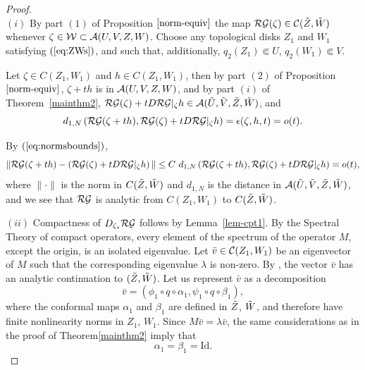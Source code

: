 \begin{proof} $\phantom{oo}$\\
\noindent $(i)$  By part $(1)$ of  Proposition $\ref{norm-equiv}$ the map $\mathcal{RG}(\zeta) \in  \mathcal{C}(\tilde Z,\tilde W)$ whenever $\zeta \in \mathcal{W} \subset \mathcal{A}(U,V,Z,W)$.  Choose any topological disks $Z_1$ and $W_1$ satisfying $(\ref{eq:ZWs})$, and such that, additionally, $q_2(Z_1) \Subset U$, $q_2(W_1) \Subset V$.

Let $\zeta \in C(Z_1,W_1)$ and $h \in C(Z_1,W_1)$, then by part $(2)$ of  Proposition $\ref{norm-equiv}$, $\zeta+t h$ is in $\mathcal{A}(U,V,Z,W)$, and by part $(i)$ of  Theorem~\ref{mainthm2},
$\mathcal{RG}(\zeta) + t D \mathcal{RG} \arrowvert_\zeta h \in \mathcal{A}(\tilde U, \tilde V, \tilde Z,\tilde W)$, and 
$$ d_{1,N} \left( \mathcal{RG}(\zeta+t h), \mathcal{RG}(\zeta) + t D \mathcal{RG} \arrowvert_\zeta h \right)=\epsilon(\zeta,h,t)=o(t).$$

By $(\ref{eq:normsbounds})$, 
$$  \| \mathcal{RG}(\zeta+t h) -\left(\mathcal{RG}(\zeta) + t D \mathcal{RG} \arrowvert_\zeta h \right) \| \le C \ d_{1,N} \left( \mathcal{RG}(\zeta+t h), \mathcal{RG}(\zeta) + t D \mathcal{RG} \arrowvert_\zeta h \right)=o(t),$$
where $\| \cdot \|$ is the norm in $C(\tilde Z, \tilde W)$ and   $d_{1,N}$ is the distance in $\mathcal{A}(\tilde U, \tilde V,\tilde Z, \tilde W)$, and we see that $\mathcal{RG}$ is analytic from $C(Z_1,W_1)$ to $C(\tilde Z, \tilde W)$.

\medskip

\noindent $(ii)$ Compactness of $D_{\zeta_*}\mathcal{RG}$ follows by  Lemma~\ref{lem-cpt1}. By the Spectral Theory of compact operators, every element of the spectrum of the operator $M$, except the origin,  is an isolated eigenvalue. Let $\bar v\in\mathcal{C}(Z_1,W_1)$ be an eigenvector of $M$ such that the corresponding eigenvalue $\lambda$ is non-zero. By , the vector $\bar v$ has an analytic continuation to $(\tilde Z,\tilde W)$. Let us represent $\bar v$ as a decomposition
$$\bar v=(\phi_1\circ q\circ\alpha_1,\psi_1\circ q\circ \beta_1),$$
 where the conformal maps $\alpha_1$ and $\beta_1$ are defined in $\tilde Z$, $\tilde W$, and therefore have finite nonlinearity norms in $Z_1$, $W_1$. Since $M\bar v=\lambda\bar v$, the same considerations as in the 
proof of Theorem\ref{mainthm2} imply that 
$$\alpha_1=\beta_1=\text{Id}.$$
\end{proof}
